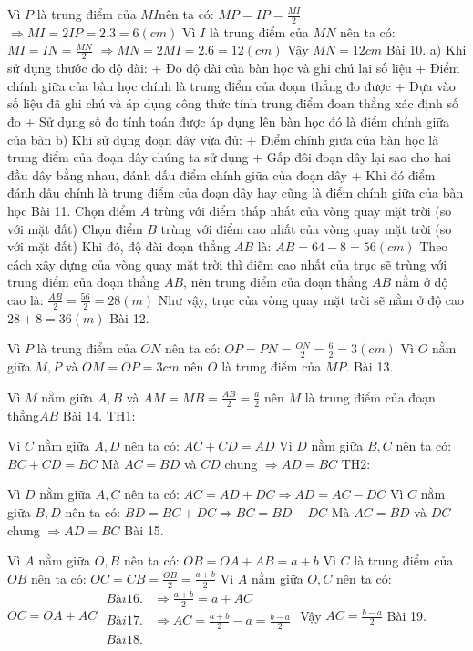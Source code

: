 Vì $P$ là trung điểm của $MI$nên ta có: $MP=IP=\frac{MI}{2}$
$\Rightarrow MI=2IP=2.3=6\left( cm \right)$
Vì $I$ là trung điểm của $MN$ nên ta có: $MI=IN=\frac{MN}{2}$
$\Rightarrow MN=2MI=2.6=12\left( cm \right)$
Vậy $MN=12cm$
Bài 10. 
a) Khi sử dụng thước đo độ dài:
+ Đo độ dài của bàn học và ghi chú lại số liệu
+ Điểm chính giữa của bàn học chính là trung điểm của đoạn thẳng đo được
+ Dựa vào số liệu đã ghi chú và áp dụng công thức tính trung điểm đoạn thẳng xác định số đo
+ Sử dụng số đo tính toán được áp dụng lên bàn học đó là điểm chính giữa của bàn
b) Khi sử dụng đoạn dây vừa đủ:
+ Điểm chính giữa của bàn học là trung điểm của đoạn dây chúng ta sử dụng
+ Gấp đôi đoạn dây lại sao cho hai đầu dây bằng nhau, đánh dấu điểm chính giữa của đoạn dây
+ Khi đó điểm đánh dấu chính là trung điểm của đoạn dây hay cũng là điểm chính giữa của bàn học
Bài 11. 
Chọn điểm $A$ trùng với điểm thấp nhất của vòng quay mặt trời (so với mặt đất)
Chọn điểm $B$ trùng với điểm cao nhất của vòng quay mặt trời (so với mặt đất)
Khi đó, độ đài đoạn thẳng $AB$ là: $AB=64-8=56\left( cm \right)$
Theo cách xây dựng của vòng quay mặt trời thì điểm cao nhất của trục sẽ trùng với trung điểm của đoạn thẳng $AB$, nên trung điểm của đoạn thẳng $AB$ nằm ở độ cao là: $\frac{AB}{2}=\frac{56}{2}=28\left( m \right)$
Như vậy, trục của vòng quay mặt trời sẽ nằm ở độ cao $28+8=36\left( m \right)$
Bài 12. 

Vì $P$ là trung điểm của $ON$ nên ta có: $OP=PN=\frac{ON}{2}=\frac{6}{2}=3\left( cm \right)$
Vì $O$ nằm giữa $M,P$ và $OM=OP=3cm$ nên $O$ là trung điểm của $MP$.
Bài 13. 

Vì $M$ nằm giữa $A,B$ và $AM=MB=\frac{AB}{2}=\frac{a}{2}$ nên $M$ là trung điểm của đoạn thẳng$AB$
Bài 14. 
TH1: 

Vì $C$ nằm giữa $A,D$ nên ta có: $AC+CD=AD$
Vì $D$ nằm giữa $B,C$ nên ta có: $BC+CD=BC$
Mà $AC=BD$ và $CD$ chung $\Rightarrow AD=BC$
TH2:

Vì $D$ nằm giữa $A,C$ nên ta có: $AC=AD+DC\Rightarrow AD=AC-DC$
Vì $C$ nằm giữa $B,D$ nên ta có: $BD=BC+DC\Rightarrow BC=BD-DC$
Mà $AC=BD$ và $DC$ chung $\Rightarrow AD=BC$
Bài 15. 

Vì $A$ nằm giữa $O,B$ nên ta có: $OB=OA+AB=a+b$
Vì $C$ là trung điểm của $OB$ nên ta có: $OC=CB=\frac{OB}{2}=\frac{a+b}{2}$
Vì $A$ nằm giữa $O,C$ nên ta có: $OC=OA+AC$
$\begin{align}
	Bài 16.   & \Rightarrow \frac{a+b}{2}=a+AC \\ 
	Bài 17.  & \Rightarrow AC=\frac{a+b}{2}-a=\frac{b-a}{2} \\ 
	Bài 18. \end{align}$
Vậy $AC=\frac{b-a}{2}$
Bài 19. 

